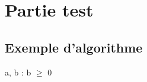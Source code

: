 \section{Partie test}

\subsection{Exemple d'algorithme}

\begin{algorithme} 
    {a, b : \real}{\real}
    {b $\geq$ 0}{} {} 
\end{algorithme}